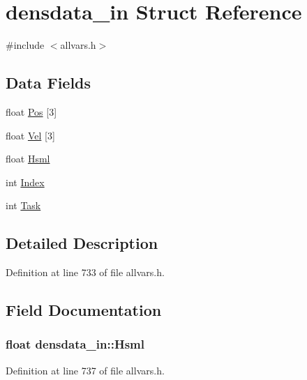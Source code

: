 \hypertarget{structdensdata__in}{
\section{densdata\_\-in Struct Reference}
\label{structdensdata__in}
}


{\ttfamily \#include $<$allvars.h$>$}

\subsection*{Data Fields}
\begin{DoxyCompactItemize}
\item 
float \hyperlink{structdensdata__in_a619b6e6d76f91b047119249915527164}{Pos} \mbox{[}3\mbox{]}
\item 
float \hyperlink{structdensdata__in_a8df7f2cfb255b800bbbbb69d674ae4ac}{Vel} \mbox{[}3\mbox{]}
\item 
float \hyperlink{structdensdata__in_a5a572c3fbe7024feabd787fde3bd8689}{Hsml}
\item 
int \hyperlink{structdensdata__in_a1c79a4d4fdcc9e483946193f2d030308}{Index}
\item 
int \hyperlink{structdensdata__in_a010be125c58096f5cd2fec47f210747b}{Task}
\end{DoxyCompactItemize}


\subsection{Detailed Description}


Definition at line 733 of file allvars.h.



\subsection{Field Documentation}
\hypertarget{structdensdata__in_a5a572c3fbe7024feabd787fde3bd8689}{
\subsubsection[{Hsml}]{\setlength{\rightskip}{0pt plus 5cm}float {\bf densdata\_\-in::Hsml}}}
\label{structdensdata__in_a5a572c3fbe7024feabd787fde3bd8689}


Definition at line 737 of file allvars.h.



